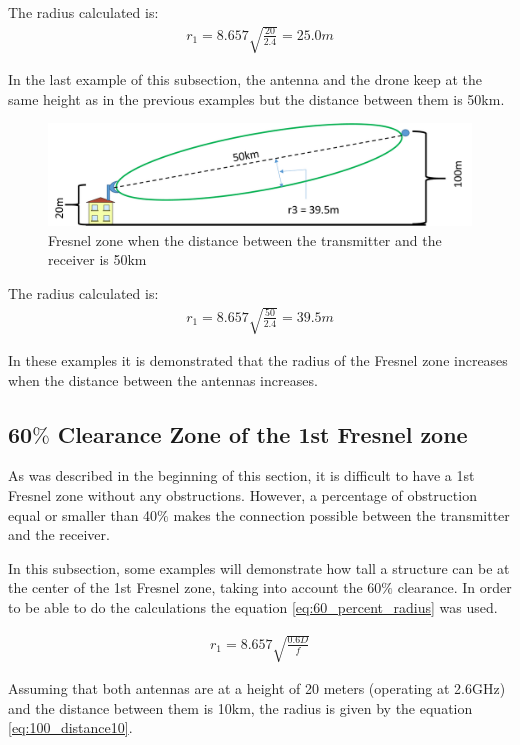 The radius calculated is:
\begin{align*}
r_1 = 8.657 \sqrt{\frac{20}{2.4}} = 25.0m
\end{align*}

In the last example of this subsection, the antenna and the drone keep at the same height as in the previous examples but the distance between them is 50km.

\begin{figure}[H]
	\centering
	\includegraphics[scale=0.50]{figures/fresnel_50km.png}
	\caption{Fresnel zone when the distance between the transmitter and the receiver is 50km}
	\label{fig:fresnel_zones_50km}
\end{figure}  

The radius calculated is:
\begin{align*}
r_1 = 8.657\sqrt{\frac{50}{2.4}} = 39.5m
\end{align*}

In these examples it is demonstrated that the radius of the Fresnel zone increases when the distance between the antennas increases.

\subsection{60$\%$ Clearance Zone of the 1st Fresnel zone}
As was described in the beginning of this section, it is difficult to have a 1st Fresnel zone without any obstructions. However, a percentage of obstruction equal or smaller than 40$\%$ makes the connection possible between the transmitter and the receiver.

In this subsection, some examples will demonstrate how tall a structure can be at the center of the 1st Fresnel zone, taking into account the 60$\%$ clearance. In order to be able to do the calculations the equation \ref{eq:60_percent_radius} was used.

\begin{align}
r_1 = 8.657\sqrt{\frac{0.6D}{f}}\label{eq:60_percent_radius}
\end{align}

Assuming that both antennas are at a height of 20 meters (operating at 2.6GHz) and the distance between them is 10km, the radius is given by the equation \ref{eq:100_distance10}.

